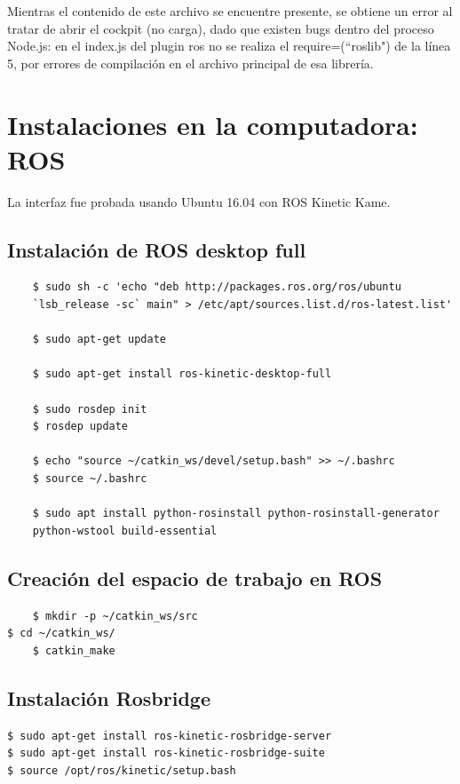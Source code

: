 \par Mientras el contenido de este archivo se encuentre presente, se obtiene un error al tratar de abrir el cockpit (no carga), dado que existen bugs dentro del proceso Node.js: en el index.js del plugin ros no se realiza el require=(``roslib") de la línea 5, por errores de compilación en el archivo principal de esa librería. 

\section{Instalaciones en la computadora: ROS}

La interfaz fue probada usando Ubuntu 16.04 con ROS Kinetic Kame.

    \subsection{Instalación de ROS desktop full}

    \begin{verbatim}
	$ sudo sh -c 'echo "deb http://packages.ros.org/ros/ubuntu 
	`lsb_release -sc` main" > /etc/apt/sources.list.d/ros-latest.list'
	
	$ sudo apt-get update
	
	$ sudo apt-get install ros-kinetic-desktop-full
	
	$ sudo rosdep init
	$ rosdep update
	
	$ echo "source ~/catkin_ws/devel/setup.bash" >> ~/.bashrc
	$ source ~/.bashrc
	
	$ sudo apt install python-rosinstall python-rosinstall-generator 
	python-wstool build-essential
	\end{verbatim}
	
    \subsection{Creación del espacio de trabajo en ROS}
	
	\begin{verbatim}
	$ mkdir -p ~/catkin_ws/src
$ cd ~/catkin_ws/
	$ catkin_make
    \end{verbatim}
	
    \subsection{Instalación Rosbridge}
    \begin{verbatim}
$ sudo apt-get install ros-kinetic-rosbridge-server
$ sudo apt-get install ros-kinetic-rosbridge-suite
$ source /opt/ros/kinetic/setup.bash
    \end{verbatim}
    
